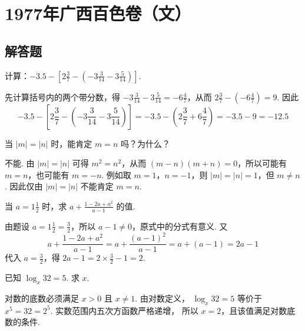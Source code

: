\chapter{1977年广西百色卷（文）}

\section{解答题}

\begin{problem}
计算：\(-3.5-\left[2\frac{3}{7}-\left(-3\frac{3}{14}-3\frac{5}{14}\right)\right]\).
\end{problem}

\begin{solution}
先计算括号内的两个带分数，得
\(-3\frac{3}{14}-3\frac{5}{14}=-6\frac{4}{7}\)，从而
\(2\frac{3}{7}-(-6\frac{4}{7})=9\). 因此
\[
-3.5-\left[2\frac{3}{7}-\left(-3\frac{3}{14}-3\frac{5}{14}\right)\right]
=-3.5-\left(2\frac{3}{7}+6\frac{4}{7}\right)
=-3.5-9=-12.5
\]
\end{solution}

\begin{problem}
当 \(|m|=|n|\) 时，能肯定 \(m=n\) 吗？为什么？
\end{problem}

\begin{solution}
不能. 由 \(|m|=|n|\) 可得 \(m^2=n^2\)，从而
\((m-n)(m+n)=0\)，所以可能有 \(m=n\)，也可能有 \(m=-n\). 例如取
\(m=1\)，\(n=-1\)，则 \(|m|=|n|=1\)，但 \(m\ne n\). 因此仅由
\(|m|=|n|\) 不能肯定 \(m=n\).
\end{solution}

\begin{problem}
当 \(a=1\frac{1}{2}\) 时，求 \(a+\frac{1-2a+a^2}{a-1}\) 的值.
\end{problem}

\begin{solution}
由题设 \(a=1\frac{1}{2}=\frac{3}{2}\)，所以 \(a-1\ne0\)，原式中的分式有意义. 又
\[
a+\frac{1-2a+a^2}{a-1}
=a+\frac{(a-1)^2}{a-1}
=a+(a-1)=2a-1
\]
代入 \(a=\frac{3}{2}\)，得 \(2a-1=2\times\frac{3}{2}-1=2\).
\end{solution}

\begin{problem}
已知 \(\log_{x}32=5\). 求 \(x\).
\end{problem}

\begin{solution}
对数的底数必须满足 \(x>0\) 且 \(x\ne1\). 由对数定义，
\(\log_x32=5\) 等价于 \(x^5=32=2^5\). 实数范围内五次方函数严格递增，
所以 \(x=2\)，且该值满足对数底数的条件.
\end{solution}

